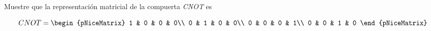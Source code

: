 \documentclass[./../main.tex]{subfiles}
\begin{document}
    \section{}

    Muestre que la representación matricial de la compuerta \emph{CNOT} es

    \begin{equation*}
        CNOT = \begin{pNiceMatrix}
            1 & 0 & 0 & 0\\
            0 & 1 & 0 & 0\\
            0 & 0 & 0 & 1\\
            0 & 0 & 1 & 0
        \end{pNiceMatrix}
    \end{equation*}
\end{document}

